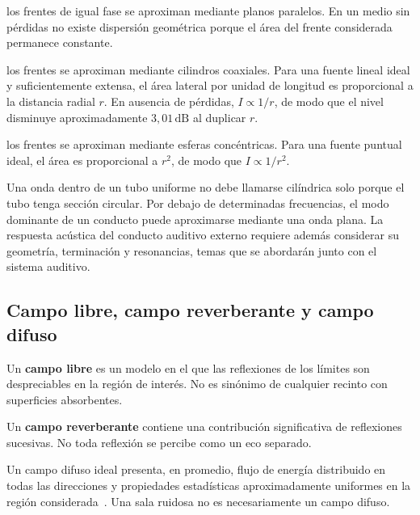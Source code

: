 \begin{description}[style=nextline]
    \item[\textbf{Onda plana:}]
    los frentes de igual fase se aproximan mediante planos paralelos. En un
    medio sin pérdidas no existe dispersión geométrica porque el área del
    frente considerada permanece constante.

    \item[\textbf{Onda cilíndrica:}]
    los frentes se aproximan mediante cilindros coaxiales. Para una fuente
    lineal ideal y suficientemente extensa, el área lateral por unidad de
    longitud es proporcional a la distancia radial \(r\). En ausencia de
    pérdidas, \(I\propto1/r\), de modo que el nivel disminuye aproximadamente
    \(3{,}01\,\text{dB}\) al duplicar \(r\).

    \item[\textbf{Onda esférica:}]
    los frentes se aproximan mediante esferas concéntricas. Para una fuente
    puntual ideal, el área es proporcional a \(r^2\), de modo que
    \(I\propto1/r^2\).
\end{description}

Una onda dentro de un tubo uniforme no debe llamarse cilíndrica solo porque el
tubo tenga sección circular. Por debajo de determinadas frecuencias, el modo
dominante de un conducto puede aproximarse mediante una onda plana. La
respuesta acústica del conducto auditivo externo requiere además considerar su
geometría, terminación y resonancias, temas que se abordarán junto con el
sistema auditivo.

\subsection{Campo libre, campo reverberante y campo difuso}
\label{sec:u4-tipos-campo}

Un \textbf{campo libre} es un modelo en el que las reflexiones de los límites
son despreciables en la región de interés. No es sinónimo de cualquier recinto
con superficies absorbentes.

Un \textbf{campo reverberante} contiene una contribución significativa de
reflexiones sucesivas. No toda reflexión se percibe como un eco separado.

Un campo difuso ideal presenta, en promedio, flujo de energía
distribuido en todas las direcciones y propiedades estadísticas
aproximadamente uniformes en la región considerada~\cite{xiangBlauert2021}. Una sala ruidosa no es
necesariamente un campo difuso.

